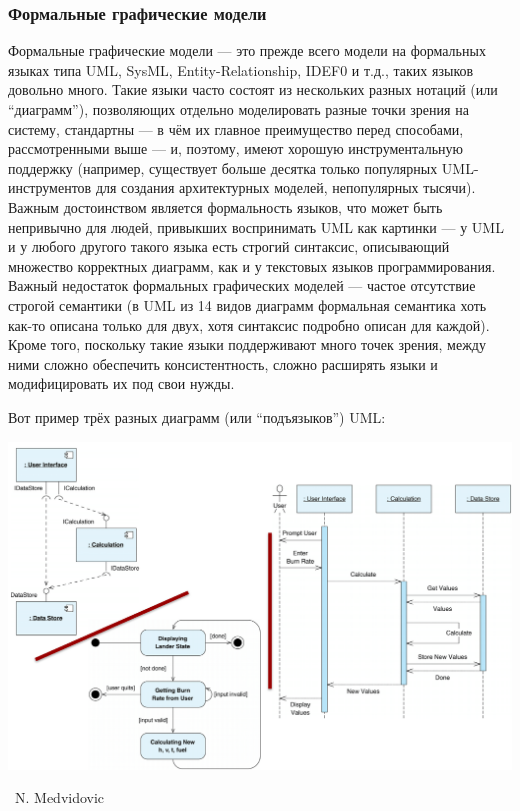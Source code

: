 \documentclass[a5paper]{article}
\newcommand{\attribution}[1] {
	\vspace{-5mm}\begin{flushright}\begin{scriptsize}%
	{\textcopyright\, #1}\end{scriptsize}\end{flushright}
}
\begin{document}
\subsubsection{Формальные графические модели}

Формальные графические модели --- это прежде всего модели на формальных языках типа UML, SysML, Entity-Relationship, IDEF0 и т.д., таких языков довольно много. Такие языки часто состоят из нескольких разных нотаций (или ``диаграмм''), позволяющих отдельно моделировать разные точки зрения на систему, стандартны --- в чём их главное преимущество перед способами, рассмотренными выше --- и, поэтому, имеют хорошую инструментальную поддержку (например, существует больше десятка только популярных UML-инструментов для создания архитектурных моделей, непопулярных тысячи). Важным достоинством является формальность языков, что может быть непривычно для людей, привыкших воспринимать UML как картинки --- у UML и у любого другого такого языка есть строгий синтаксис, описывающий множество корректных диаграмм, как и у текстовых языков программирования. Важный недостаток формальных графических моделей --- частое отсутствие строгой семантики (в UML из 14 видов диаграмм формальная семантика хоть как-то описана только для двух, хотя синтаксис подробно описан для каждой). Кроме того, поскольку такие языки поддерживают много точек зрения, между ними сложно обеспечить консистентность, сложно расширять языки и модифицировать их под свои нужды.

Вот пример трёх разных диаграмм (или ``подъязыков'') UML:

\begin{center}
	\includegraphics[width=\textwidth]{uml.png}
	\attribution{N. Medvidovic}
\end{center}
\end{document}
